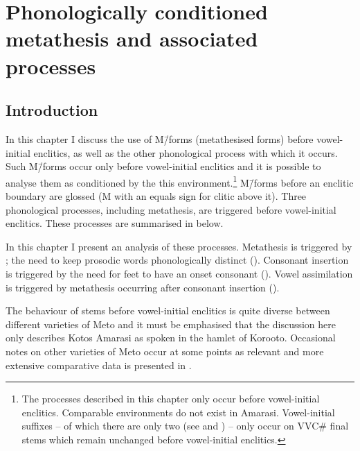 \chapter{Phonologically conditioned metathesis and associated processes}\label{ch:PhoMet}

\section{Introduction}\label{sec:Int ch:PhoMet}
In this chapter I discuss the use of M\=/forms (metathesised forms)
before vowel-initial enclitics,
as well as the other phonological process with which it occurs.
Such M\=/forms occur only before vowel-initial enclitics
and it is possible to analyse them as conditioned by the this environment.\footnote{
		The processes described in this chapter only occur before vowel-initial enclitics.
		Comparable environments do not exist in Amarasi.
		Vowel-initial suffixes -- of which there are only two
		(see  and ) --
		only occur on VVC{\#} final stems
		which remain unchanged before vowel-initial enclitics.}
M\=/forms before an enclitic boundary are glossed {\Mvv}
(M with an equals sign for clitic above it).
Three phonological processes, including metathesis,
are triggered before vowel-initial enclitics.
These processes are summarised in  below.

\begin{exe}
	\label{ex:ProEncBou}
	\begin{xlist}
	\end{xlist}
\end{exe}

In this chapter I present an analysis of these processes.
Metathesis is triggered by ;
the need to keep prosodic words phonologically distinct ().
Consonant insertion is triggered by the need for feet to have an onset consonant ().
Vowel assimilation is triggered by metathesis occurring after consonant insertion ().

The behaviour of stems before vowel-initial enclitics
is quite diverse between different varieties of Meto
and it must be emphasised that the discussion here
only describes Kotos Amarasi as spoken in the hamlet of Koro{\Q}oto.
Occasional notes on other varieties of Meto occur at some points as relevant
and more extensive comparative data is presented in .

